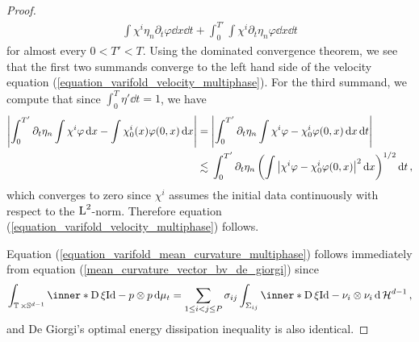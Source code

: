\begin{proof}
\begin{align*}
			\int
				\chi^{ i }
				\eta_{ n }
				\partial_{ t } \varphi 
			\dd{ x }
		\dd{ t }
		+
		\int_{ 0 }^{ T' }
			\int
				\chi^{ i }
				\partial_{ t } \eta_{ n }
				\varphi
			\dd{ x }
		\dd{ t }
	\end{align*}
	for almost every $ 0 < T' < T $.
	Using the dominated convergence theorem, we see that the first two summands 
	converge to the left hand side of the velocity equation 
	(\ref{equation_varifold_velocity_multiphase}). For the third summand, we 
	compute that since $ \int_{ 0 }^{ T } \eta' \dd{ t } = 1 $, we have
	\begin{align*}
		\abs{
			\int_{ 0 }^{ T' }
				\partial_{ t } \eta_{ n }
				\int
					\chi^{ i }
					\varphi
				\dd{ x }
			-
			\int
				\chi_{ 0 }^{ i } ( x )
				\varphi ( 0 , x )
			\dd{ x }
		}
		={} &
		\abs{ 
			\int_{ 0 }^{ T' }
				\partial_{ t } \eta_{ n }
				\int
					\chi^{ i }
					\varphi
					-
					\chi_{ 0 }^{ i }
					\varphi ( 0 , x )
				\dd{ x }
			\dd{ t }
		}
		\\
		\lesssim{} &
		\int_{ 0 }^{ T' } 
			\partial_{ t } \eta_{ n }
			\left(
				\int
					\abs{ \chi^{ i } \varphi - \chi_{ 0 }^{ i } \varphi ( 0 , x 
					) 
					}^{ 2 }
				\dd{ x }
			\right)^{ 1/2 }
		\dd{ t },
	\end{align*}
	which converges to zero since $ \chi^{ i } $ assumes the initial data 
	continuously with respect to the $ \operatorname{L}^{ 2 } $-norm. Therefore equation 
	(\ref{equation_varifold_velocity_multiphase}) follows.
	
	Equation (\ref{equation_varifold_mean_curvature_multiphase}) follows 
	immediately from equation (\ref{mean_curvature_vector_bv_de_giorgi})
	since
	\begin{equation*}
		\int_{ \flattorus \times \mathbb{ S }^{ d - 1 } }
			\inner*{ \diff \xi }{ \mathrm{Id} - p \otimes p }
		\dd{ \mu_{ t } }
		=
		\sum_{ 1 \leq i < j \leq P }
			\sigma_{ i j }
			\int_{ \Sigma_{ i j } }
				\inner*{ \diff \xi }{\mathrm{Id} - \nu_{i } \otimes \nu_{ i } }
			\dd{ \hm^{ d - 1 } },
	\end{equation*}
	and De Giorgi's optimal energy dissipation inequality is also identical.
	

\end{proof}
